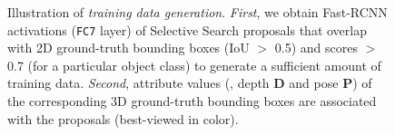 \documentclass[10pt,twocolumn,letterpaper]{article}
\begin{document}
\begin{figure}
\caption{Illustration of \emph{training data generation}. \emph{First}, 
we obtain Fast-RCNN \cite{Girshick15a} activations (\texttt{FC7} layer)
of Selective Search \cite{Uijlings13a} proposals  
that overlap with 2D ground-truth bounding boxes (IoU $>$ 0.5) 
and scores $>$ 0.7 (for a particular object class) 
to generate a sufficient amount of training data. 
\emph{Second}, attribute values (\ie, depth \textbf{D} and pose 
\textbf{P}) 
of the corresponding 3D ground-truth bounding boxes are 
associated with the proposals (best-viewed in color). \label{fig:trainingdata}}
\end{figure}
\end{document}

